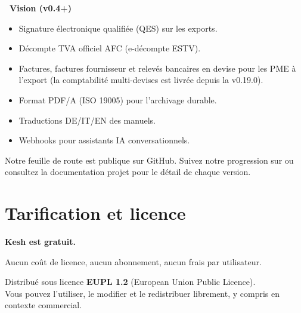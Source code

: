 \documentclass[a4paper,11pt,oneside]{article}
\begin{document}
\vspace{0.4cm}

\textbf{\color{keshPrimaryLight}\faRocket\ Vision (v0.4+)}

\begin{itemize}
    \item Signature électronique qualifiée (QES) sur les exports.
    \item Décompte TVA officiel AFC (e-décompte ESTV).
    \item Factures, factures fournisseur et relevés bancaires en devise pour les PME à l'export (la comptabilité multi-devises est livrée depuis la v0.19.0).
    \item Format PDF/A (ISO 19005) pour l'archivage durable.
    \item Traductions DE/IT/EN des manuels.
    \item Webhooks pour assistants IA conversationnels.
\end{itemize}

\vspace{0.5cm}

\begin{keshnote}
Notre feuille de route est publique sur GitHub. Suivez notre progression sur \keshWebsite ou consultez la documentation projet pour le détail de chaque version.
\end{keshnote}


\clearpage

\section*{\color{keshPrimary}Tarification et licence}

\vspace{0.5cm}

\begin{tcolorbox}[%
    enhanced,
    colback=keshSurfaceAlt, colframe=keshPrimary,
    boxrule=2pt, arc=8pt,
    halign=center%
]
\sffamily

\vspace{0.3cm}

{\Huge\bfseries\color{keshPrimary}Kesh est gratuit.}

\vspace{0.4cm}

{\large Aucun coût de licence, aucun abonnement, aucun frais par utilisateur.}

\vspace{0.4cm}

{\normalsize Distribué sous licence \textbf{EUPL 1.2} (European Union Public Licence).\\
Vous pouvez l'utiliser, le modifier et le redistribuer librement, y compris en contexte commercial.}

\vspace{0.3cm}

\end{tcolorbox}
\end{document}
